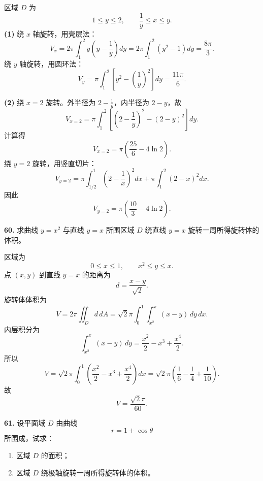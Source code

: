 \begin{solutionblock}
区域 \(D\) 为
\[
1\le y\le2,\qquad \frac1y\le x\le y.
\]
\textbf{(1)} 绕 \(x\) 轴旋转，用壳层法：
\[
V_x=2\pi\int_1^2 y\left(y-\frac1y\right)dy
=2\pi\int_1^2(y^2-1)dy
=\boxed{\frac{8\pi}{3}}.
\]
绕 \(y\) 轴旋转，用圆环法：
\[
V_y=\pi\int_1^2\left[y^2-\left(\frac1y\right)^2\right]dy
=\boxed{\frac{11\pi}{6}}.
\]

\textbf{(2)} 绕 \(x=2\) 旋转。外半径为 \(2-\frac1y\)，内半径为 \(2-y\)，故
\[
V_{x=2}
=\pi\int_1^2\left[\left(2-\frac1y\right)^2-(2-y)^2\right]dy.
\]
计算得
\[
V_{x=2}
=\boxed{\pi\left(\frac{25}{6}-4\ln2\right)}.
\]
绕 \(y=2\) 旋转，用竖直切片：
\[
V_{y=2}
=\pi\int_{1/2}^{1}\left(2-\frac1x\right)^2dx
+\pi\int_1^2(2-x)^2dx.
\]
因此
\[
V_{y=2}
=\boxed{\pi\left(\frac{10}{3}-4\ln2\right)}.
\]
\end{solutionblock}

\begin{problemblock}
\textbf{60.} 求曲线 \(y=x^2\) 与直线 \(y=x\) 所围区域 \(D\) 绕直线 \(y=x\) 旋转一周所得旋转体的体积。
\end{problemblock}

\begin{solutionblock}
区域为
\[
0\le x\le1,\qquad x^2\le y\le x.
\]
点 \((x,y)\) 到直线 \(y=x\) 的距离为
\[
d=\frac{x-y}{\sqrt2}.
\]
旋转体体积为
\[
V=2\pi\iint_D d\,dA
=\sqrt2\pi\int_0^1\int_{x^2}^{x}(x-y)\,dy\,dx.
\]
内层积分为
\[
\int_{x^2}^{x}(x-y)\,dy
=\frac{x^2}{2}-x^3+\frac{x^4}{2}.
\]
所以
\[
V=\sqrt2\pi\int_0^1\left(\frac{x^2}{2}-x^3+\frac{x^4}{2}\right)dx
=\sqrt2\pi\left(\frac16-\frac14+\frac1{10}\right).
\]
故
\[
\boxed{V=\frac{\sqrt2\pi}{60}}.
\]
\end{solutionblock}

\begin{problemblock}
\textbf{61.} 设平面域 \(D\) 由曲线
\[
r=1+\cos\theta
\]
所围成，试求：
\begin{enumerate}
\item 区域 \(D\) 的面积；
\item 区域 \(D\) 绕极轴旋转一周所得旋转体的体积。
\end{enumerate}
\end{problemblock}


